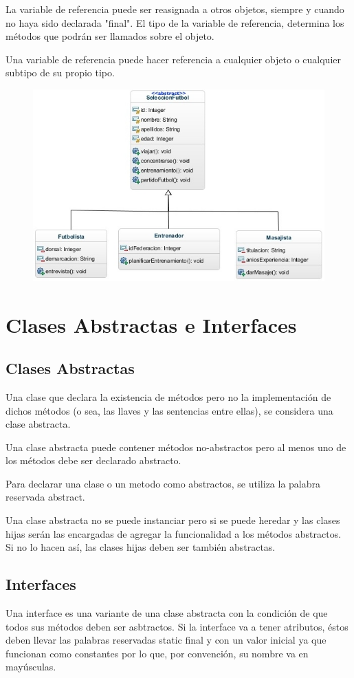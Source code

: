 \documentclass[12pt,a4paper]{report}
\begin{document}
{La variable de referencia puede ser reasignada a otros objetos, siempre y cuando no haya sido declarada "final". El tipo de la variable de referencia, determina los métodos que podrán ser llamados sobre el objeto.

Una variable de referencia puede hacer referencia a cualquier objeto o cualquier subtipo de su propio tipo.\begin{figure}[hbtp]
\centering
\includegraphics[scale=0.5]{PolimorfismoFutbol-diag.jpg}
\end{figure}
\section*{Clases Abstractas e Interfaces}
\subsection*{Clases Abstractas }
Una clase que declara la existencia de métodos pero no la implementación de dichos métodos (o sea, las llaves { } y las sentencias entre ellas), se considera una clase abstracta. 

Una clase abstracta puede contener métodos no-abstractos pero al menos uno de los métodos debe ser declarado abstracto. 

Para declarar una clase o un metodo como abstractos, se utiliza la palabra reservada abstract. 

Una clase abstracta no se puede instanciar pero si se puede heredar y las clases hijas serán las encargadas de agregar la funcionalidad a los métodos abstractos. Si no lo hacen así, las clases hijas deben ser también abstractas.
\subsection*{Interfaces }
Una interface es una variante de una clase abstracta con la condición de que todos sus métodos deben ser asbtractos. Si la interface va a tener atributos, éstos deben llevar las palabras reservadas static final y con un valor inicial ya que funcionan como constantes por lo que, por convención, su nombre va en mayúsculas. 

}
\end{document}
